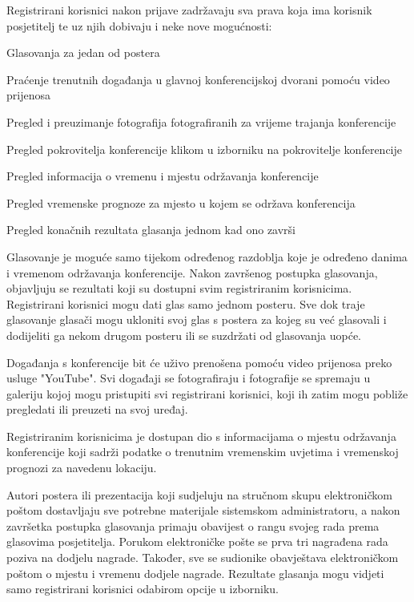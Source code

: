 		Registrirani korisnici nakon prijave zadržavaju sva prava koja ima korisnik posjetitelj te uz njih dobivaju i neke nove mogućnosti:
		\begin{packed_item}
			\item Glasovanja za jedan od postera
			\item Praćenje trenutnih događanja u glavnoj konferencijskoj dvorani pomoću video prijenosa
			\item Pregled i preuzimanje fotografija fotografiranih za vrijeme trajanja konferencije
			\item Pregled pokrovitelja konferencije klikom u izborniku na pokrovitelje konferencije
			\item Pregled informacija o vremenu i mjestu održavanja konferencije
			\item Pregled vremenske prognoze za mjesto u kojem se održava konferencija
			\item Pregled konačnih rezultata glasanja jednom kad ono završi
		\end{packed_item}
		
		Glasovanje je moguće samo tijekom određenog razdoblja koje je određeno danima i vremenom održavanja konferencije. Nakon završenog postupka glasovanja, objavljuju se rezultati koji su dostupni svim registriranim korisnicima. Registrirani korisnici mogu dati glas samo jednom posteru. Sve dok traje glasovanje glasači mogu ukloniti svoj glas s postera za kojeg su već glasovali i dodijeliti ga nekom drugom posteru ili se suzdržati od glasovanja uopće.
		
		Događanja s konferencije bit će uživo prenošena pomoću video prijenosa preko usluge "YouTube". Svi događaji se fotografiraju i fotografije se spremaju u galeriju kojoj mogu pristupiti svi registrirani korisnici, koji ih zatim mogu pobliže pregledati ili preuzeti na svoj uređaj.
		
		Registriranim korisnicima je dostupan dio s informacijama o mjestu održavanja konferencije koji sadrži podatke o trenutnim vremenskim uvjetima i vremenskoj prognozi za navedenu lokaciju.
		
		Autori postera ili prezentacija koji sudjeluju na stručnom skupu elektroničkom poštom dostavljaju sve potrebne materijale sistemskom administratoru, a nakon završetka postupka glasovanja primaju obavijest o rangu svojeg rada prema glasovima posjetitelja. Porukom elektroničke pošte se prva tri nagrađena rada poziva na dodjelu nagrade. Također, sve se sudionike obavještava elektroničkom poštom o mjestu i vremenu dodjele nagrade. Rezultate glasanja mogu vidjeti samo registrirani korisnici odabirom opcije u izborniku.
		
